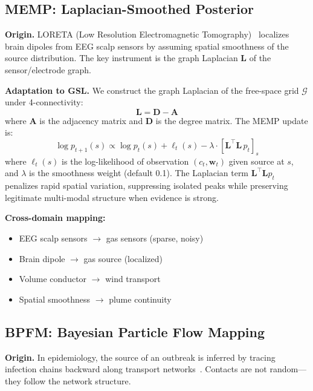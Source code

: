 \documentclass[conference]{IEEEtran}
\begin{document}
\subsection{MEMP: Laplacian-Smoothed Posterior}
\label{sec:memp}

\textbf{Origin.} LORETA (Low Resolution Electromagnetic Tomography)~\cite{pascual1994low} localizes brain dipoles from EEG scalp sensors by assuming spatial smoothness of the source distribution. The key instrument is the graph Laplacian $\mathbf{L}$ of the sensor/electrode graph.

\textbf{Adaptation to GSL.} We construct the graph Laplacian of the free-space grid $\mathcal{G}$ under 4-connectivity:
\begin{equation}
    \mathbf{L} = \mathbf{D} - \mathbf{A}
\end{equation}
where $\mathbf{A}$ is the adjacency matrix and $\mathbf{D}$ is the degree matrix.
The MEMP update is:
\begin{equation}
    \log p_{t+1}(s) \propto \log p_t(s) + \ell_t(s) - \lambda \cdot [\mathbf{L}^\top \mathbf{L} \, p_t]_s
    \label{eq:memp}
\end{equation}
where $\ell_t(s)$ is the log-likelihood of observation $(c_t, \mathbf{w}_t)$ given source at $s$, and $\lambda$ is the smoothness weight (default 0.1).
The Laplacian term $\mathbf{L}^\top \mathbf{L} p_t$ penalizes rapid spatial variation, suppressing isolated peaks while preserving legitimate multi-modal structure when evidence is strong.

\textbf{Cross-domain mapping:}
\begin{itemize}
    \item EEG scalp sensors $\to$ gas sensors (sparse, noisy)
    \item Brain dipole $\to$ gas source (localized)
    \item Volume conductor $\to$ wind transport
    \item Spatial smoothness $\to$ plume continuity
\end{itemize}

\subsection{BPFM: Bayesian Particle Flow Mapping}
\label{sec:bpfm}

\textbf{Origin.} In epidemiology, the source of an outbreak is inferred by tracing infection chains backward along transport networks~\cite{wallinga2004different}. Contacts are not random---they follow the network structure.
\end{document}
